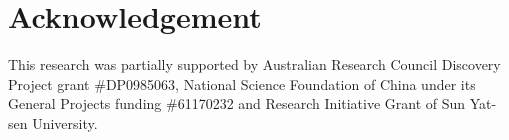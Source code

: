 \documentclass[10pt]{llncs}
\begin{document}
\section*{Acknowledgement} This research was partially supported by Australian Research Council Discovery Project grant \#DP0985063, National Science Foundation of China under its General Projects funding \#61170232 and Research Initiative Grant of Sun Yat-sen University.

 

\end{document}
